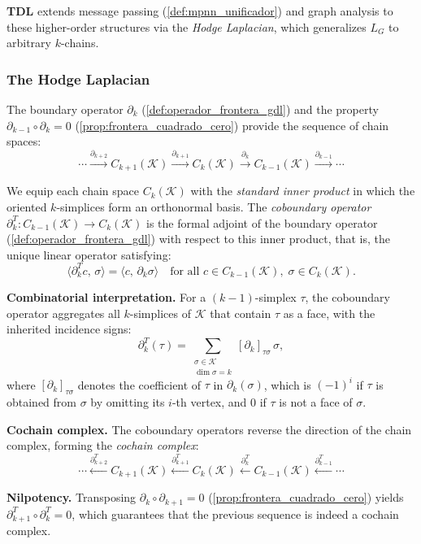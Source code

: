 \textbf{\gls{TDL}} extends message passing (\autoref{def:mpnn_unificador}) and graph analysis to these higher-order structures via the \textit{Hodge Laplacian}, which generalizes $L_G$ to arbitrary $k$-chains.

\subsubsection{The Hodge Laplacian}\label{subsubsec:hodge_laplacian_gdl}

The boundary operator $\partial_k$ (\autoref{def:operador_frontera_gdl}) and the property $\partial_{k-1} \circ \partial_k = 0$ (\autoref{prop:frontera_cuadrado_cero}) provide the sequence of chain spaces:
\[
	\cdots \xrightarrow{\partial_{k+2}} C_{k+1}(\mathcal{K}) \xrightarrow{\partial_{k+1}} C_k(\mathcal{K}) \xrightarrow{\partial_k} C_{k-1}(\mathcal{K}) \xrightarrow{\partial_{k-1}} \cdots
\]

\begin{definition}\label{def:operador_cofrontera_gdl}
	We equip each chain space $C_k(\mathcal{K})$ with the \textit{standard inner product} in which the oriented $k$-simplices form an orthonormal basis. The \textit{coboundary operator} $\partial_k^T : C_{k-1}(\mathcal{K}) \to C_k(\mathcal{K})$ is the formal adjoint of the boundary operator (\autoref{def:operador_frontera_gdl}) with respect to this inner product, that is, the unique linear operator satisfying:
	\[
		\langle \partial_k^T c, \, \sigma \rangle = \langle c, \, \partial_k \sigma \rangle \quad \text{for all } c \in C_{k-1}(\mathcal{K}),\; \sigma \in C_k(\mathcal{K}).
	\]

	\textbf{Combinatorial interpretation.} For a $(k{-}1)$-simplex $\tau$, the coboundary operator aggregates all $k$-simplices of $\mathcal{K}$ that contain $\tau$ as a face, with the inherited incidence signs:
	\[
		\partial_k^T(\tau) = \sum_{\substack{\sigma \in \mathcal{K} \\ \dim \sigma = k}} [\partial_k]_{\tau\sigma} \, \sigma,
	\]
	where $[\partial_k]_{\tau\sigma}$ denotes the coefficient of $\tau$ in $\partial_k(\sigma)$, which is $(-1)^i$ if $\tau$ is obtained from $\sigma$ by omitting its $i$-th vertex, and $0$ if $\tau$ is not a face of $\sigma$.

	\textbf{Cochain complex.} The coboundary operators reverse the direction of the chain complex, forming the \textit{cochain complex}:
	\[
		\cdots \xleftarrow{\partial_{k+2}^T} C_{k+1}(\mathcal{K}) \xleftarrow{\partial_{k+1}^T} C_k(\mathcal{K}) \xleftarrow{\partial_k^T} C_{k-1}(\mathcal{K}) \xleftarrow{\partial_{k-1}^T} \cdots
	\]

	\textbf{Nilpotency.} Transposing $\partial_{k} \circ \partial_{k+1} = 0$ (\autoref{prop:frontera_cuadrado_cero}) yields $\partial_{k+1}^T \circ \partial_k^T = 0$, which guarantees that the previous sequence is indeed a cochain complex.
\end{definition}

